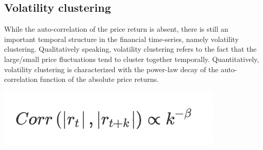 \documentclass{article}
\begin{document}
\begin{multicols}{2}
    \subsection*{Volatility clustering}
    While the auto-correlation of the price return is absent, there is still an important temporal structure in the financial time-series, namely volatility clustering. Qualitatively speaking, volatility clustering refers to the fact that the large/small price fluctuations tend to cluster together temporally. Quantitatively, volatility clustering is characterized with the power-law decay of the auto-correlation function of the absolute price returns. 
    \begin{center}
        \includegraphics[scale = 0.8]{imgs/elisa/cl.jpg} 
    \end{center}

\end{multicols}
\end{document}
